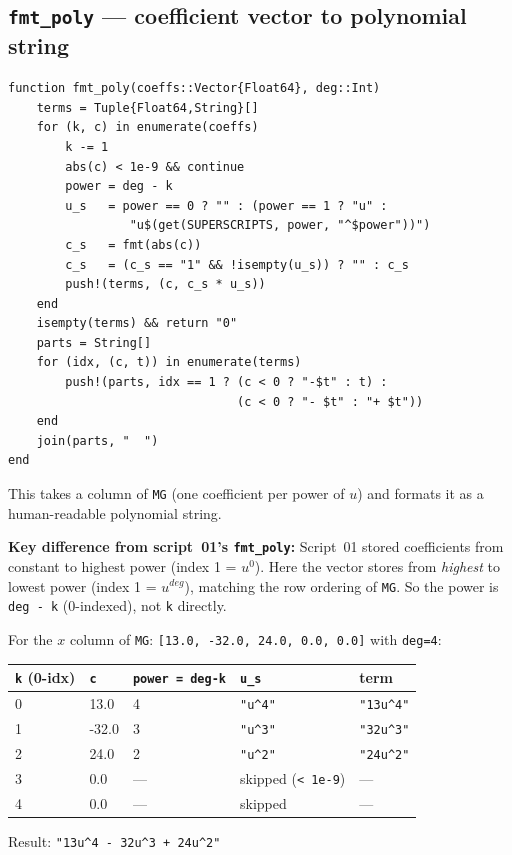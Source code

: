\documentclass[12pt, a4paper]{article}
\newcommand{\cd}[1]{\texttt{#1}}
\begin{document}
\subsection{\texttt{fmt\_poly} --- coefficient vector to polynomial string}

\begin{verbatim}
function fmt_poly(coeffs::Vector{Float64}, deg::Int)
    terms = Tuple{Float64,String}[]
    for (k, c) in enumerate(coeffs)
        k -= 1
        abs(c) < 1e-9 && continue
        power = deg - k
        u_s   = power == 0 ? "" : (power == 1 ? "u" :
                 "u$(get(SUPERSCRIPTS, power, "^$power"))")
        c_s   = fmt(abs(c))
        c_s   = (c_s == "1" && !isempty(u_s)) ? "" : c_s
        push!(terms, (c, c_s * u_s))
    end
    isempty(terms) && return "0"
    parts = String[]
    for (idx, (c, t)) in enumerate(terms)
        push!(parts, idx == 1 ? (c < 0 ? "-$t" : t) :
                                (c < 0 ? "- $t" : "+ $t"))
    end
    join(parts, "  ")
end
\end{verbatim}

This takes a column of \cd{MG} (one coefficient per power of $u$)
and formats it as a human-readable polynomial string.

\textbf{Key difference from script~01's \cd{fmt\_poly}:}
Script~01 stored coefficients from constant to highest power
(index 1 = $u^0$).
Here the vector stores from \emph{highest} to lowest power
(index 1 = $u^{deg}$), matching the row ordering of \cd{MG}.
So the power is \cd{deg - k} (0-indexed), not \cd{k} directly.

\begin{examplebox}
For the $x$ column of \cd{MG}: \cd{[13.0, -32.0, 24.0, 0.0, 0.0]}
with \cd{deg=4}:

\medskip
\begin{tabular}{lllll}
\toprule
\cd{k} (0-idx) & \cd{c} & \cd{power = deg-k} & \cd{u\_s} & term \\
\midrule
0 & 13.0  & 4 & \cd{"u\^{}4"} & \cd{"13u\^{}4"} \\
1 & -32.0 & 3 & \cd{"u\^{}3"} & \cd{"32u\^{}3"} \\
2 & 24.0  & 2 & \cd{"u\^{}2"} & \cd{"24u\^{}2"} \\
3 & 0.0   & --- & skipped (\cd{< 1e-9}) & --- \\
4 & 0.0   & --- & skipped & --- \\
\bottomrule
\end{tabular}

\medskip
Result: \cd{"13u\^{}4 - 32u\^{}3 + 24u\^{}2"}
\end{examplebox}
\end{document}
